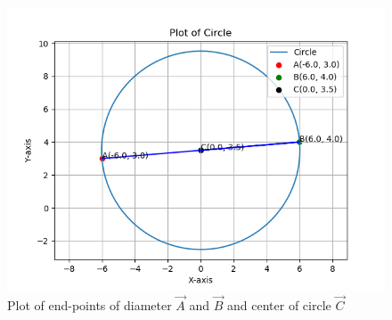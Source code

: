 \documentclass[journal]{IEEEtran}
\begin{document}
\begin{figure}[h!]
   \centering
   \includegraphics[width=1\linewidth]{figs/plot.png}
   \caption{Plot of end-points of diameter $\vec{A}$ and $\vec{B}$ and center of circle $\vec{C}$}
   \label{stemplot}
\end{figure}
\end{document}
